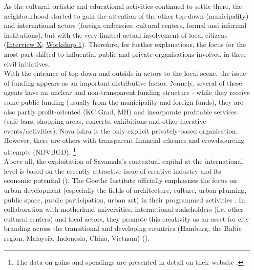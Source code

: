 \documentclass[11pt]{report}
\begin{document}
As the cultural, artistic and educational activities continued to settle there, the neighbourhood started to gain the attention of the other top-down (municipality) and international actors (foreign embassies, cultural centers, formal and informal institutions), but with the very limited actual involvement of local citizens 
(\href{InterviewX}{Interview X};
\href{Expert Workshop}{Workshop 1}).
Therefore, for further explanations, the focus for the most part shifted to influential public and private organisations involved in these civil initiatives.
\\

With the entrance of top-down and outside-in actors to the local scene, the issue of funding appears as an important distributive factor.
Namely, several of these agents have an unclear and non-transparent funding structure - while they receive some public funding (usually from the municipality and foreign funds), they are also partly profit-oriented (KC Grad, MH) and incorporate profitable services (café-bars, shopping areas, concerts, exhibitions and other lucrative events/activities).
Nova Iskra is the only explicit privately-based organisation.
However, there are others with transparent financial schemes and crowdsourcing attempts (NDVBGD).
\footnote{The data on gains and spendings are presented in detail on their website \href{NeDavimoBG}{\cite{ne_davimo_beograd_ne_2015}}.}
\\

Above all, the exploitation of Savamala’s contextual capital at the international level is based on the recently attractive issue of creative industry and its economic potential (\href{ref}{\citealt{landry_creative_2012}}).
The Goethe Institute officially emphasizes the focus on urban development (especially the fields of architecture, culture, urban planning, public space, public participation, urban art) in their programmed activities \href{Goethe}{\cite{architecture_-_goethe-institut_architecture_2016}}.
In collaboration with motherland universities, international stakeholders (i.e. other cultural centers) and local actors, they promote this creativity as an asset for city branding across the transitional and developing countries (Hamburg, the Baltic region, Malaysia, Indonesia, China, Vietnam) (\href{ref}{\citealt{waibel_creativity_2014}}).
\\
\end{document}
